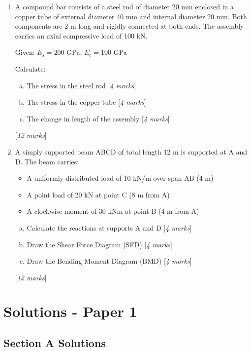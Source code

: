 \documentclass[12pt,a4paper]{article}
\newcommand{\marks}[1]{\hfill[\textit{\color{examred}#1 marks}]}
\begin{document}
\begin{enumerate}[label=\textbf{Q\arabic*.}, start=15, itemsep=20pt]

\item A compound bar consists of a steel rod of diameter 20 mm enclosed in a copper tube of external diameter 40 mm and internal diameter 20 mm. Both components are 2 m long and rigidly connected at both ends. The assembly carries an axial compressive load of 100 kN.

Given: $E_s = 200$ GPa, $E_c = 100$ GPa

Calculate:
\begin{enumerate}[(a)]
    \item The stress in the steel rod \marks{4}
    \item The stress in the copper tube \marks{4}
    \item The change in length of the assembly \marks{4}
\end{enumerate}\marks{12}

\item A simply supported beam ABCD of total length 12 m is supported at A and D. The beam carries:
\begin{itemize}
    \item A uniformly distributed load of 10 kN/m over span AB (4 m)
    \item A point load of 20 kN at point C (8 m from A)
    \item A clockwise moment of 30 kNm at point B (4 m from A)
\end{itemize}

\begin{enumerate}[(a)]
    \item Calculate the reactions at supports A and D \marks{4}
    \item Draw the Shear Force Diagram (SFD) \marks{4}
    \item Draw the Bending Moment Diagram (BMD) \marks{4}
\end{enumerate}\marks{12}

\end{enumerate}

\newpage
\section*{Solutions - Paper 1}

\subsection*{Section A Solutions}
\end{document}
